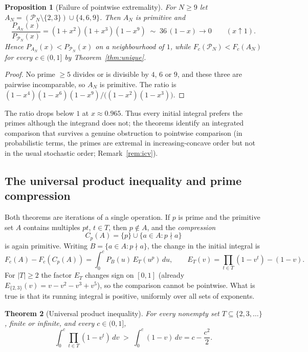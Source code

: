 \documentclass[11pt]{article}
\newtheorem{theorem}{Theorem}[section]
\newtheorem{proposition}[theorem]{Proposition}
\theoremstyle{remark}
\newcommand{\Prm}{\mathcal{P}}
\begin{document}
\begin{proposition}[Failure of pointwise extremality]\label{prop:pointwise}
For $N\ge9$ let $A_N=(\Prm_N\setminus\{2,3\})\cup\{4,6,9\}$. Then $A_N$
is primitive and
\[
  \frac{P_{A_N}(x)}{P_{\Prm_N}(x)}=(1+x^2)(1+x^3)(1-x^9)
  \;\sim\;36\,(1-x)\longrightarrow0\qquad(x\uparrow1).
\]
Hence $P_{A_N}(x)<P_{\Prm_N}(x)$ on a neighbourhood of $1$, while
$F_c(\Prm_N)<F_c(A_N)$ for every $c\in(0,1]$ by
Theorem~\ref{thm:unique}.
\end{proposition}

\begin{proof}
No prime $\ge5$ divides or is divisible by $4$, $6$ or $9$, and these
three are pairwise incomparable, so $A_N$ is primitive. The ratio is
$(1-x^4)(1-x^6)(1-x^9)/\bigl((1-x^2)(1-x^3)\bigr)$.
\end{proof}

The ratio drops below $1$ at $x\approx0.965$. Thus every initial
integral prefers the primes although the integrand does not; the
theorems identify an integrated comparison that survives a genuine
obstruction to pointwise comparison (in probabilistic terms, the primes
are extremal in increasing-concave order but not in the usual stochastic
order; Remark~\ref{rem:icv}).

\subsection{The universal product inequality and prime compression}
Both theorems are iterations of a single operation. If $p$ is prime
and the primitive set $A$ contains multiples $pt$, $t\in T$, then
$p\notin A$, and the \emph{compression}
\[
  C_p(A)=\{p\}\cup\{a\in A:p\nmid a\}
\]
is again primitive. Writing $B=\{a\in A:p\nmid a\}$, the change in the
initial integral is
\begin{equation}\label{eq:exchange}
  F_c(A)-F_c(C_p(A))=\int_0^cP_B(u)\,E_T(u^p)\,du,
  \qquad
  E_T(v)=\prod_{t\in T}(1-v^t)-(1-v).
\end{equation}
For $|T|\ge2$ the factor $E_T$ changes sign on $[0,1]$ (already
$E_{\{2,3\}}(v)=v-v^2-v^3+v^5$), so the comparison cannot be pointwise. What is true is that its running
integral is positive, uniformly over all sets of exponents.

\begin{theorem}[Universal product inequality]\label{thm:running}
For every nonempty set $T\subseteq\{2,3,\dots\}$, finite or infinite,
and every $c\in(0,1]$,
\[
  \int_0^c\prod_{t\in T}(1-v^t)\,dv\;>\;\int_0^c(1-v)\,dv=c-\frac{c^2}{2}.
\]
\end{theorem}
\end{document}
